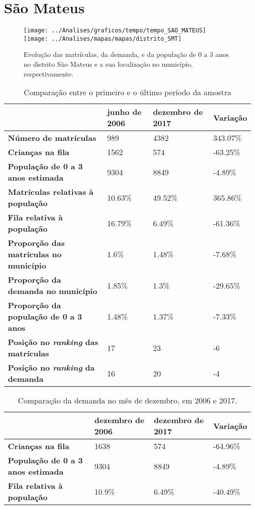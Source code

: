 \section{São Mateus}
\begin{figure}[H]
\centering
\texttt{[image: ../Analises/graficos/tempo/tempo\_SAO\_MATEUS]}
\texttt{[image: ../Analises/mapas/mapas/distrito\_SMT]}
\caption{Evolução das matrículas, da demanda, e da população de 0 a 3 anos no distrito São Mateus e a sua localização no município, respectivamente.}
\end{figure}
\begin{table}[H]
\begin{tabular}{l|l|l|l}
\textbf{}                                      & \textbf{junho de 2006}       & \textbf{dezembro de 2017}    & \textbf{Variação} \\ \hline
\textbf{Número de matrículas}                  & 989 & 4382 & 343.07\% \\ \hline
\textbf{Crianças na fila}                      & 1562 & 574 & -63.25\% \\ \hline
\textbf{População de 0 a 3 anos estimada}      & 9304 & 8849 & -4.89\% \\ \hline
\textbf{Matrículas relativas à população}      & 10.63\% & 49.52\% & 365.86\% \\ \hline
\textbf{Fila relativa à população}             & 16.79\% & 6.49\% & -61.36\% \\ \hline
\textbf{Proporção das matrículas no município} & 1.6\% & 1.48\% & -7.68\% \\ \hline
\textbf{Proporção da demanda no município}     & 1.85\% & 1.3\% & -29.65\% \\ \hline
\textbf{Proporção da população de 0 a 3 anos}  & 1.48\% & 1.37\% & -7.33\% \\ \hline
\textbf{Posição no \textit{ranking} das matrículas}     & 17 & 23 & -6 \\ \hline
\textbf{Posição no \textit{ranking} da demanda}         & 16 & 20 & -4 \\ 
\end{tabular}
\caption{Comparação entre o primeiro e o último período da amostra}
\end{table}
\begin{table}[H]
\begin{tabular}{l|l|l|l}
\textbf{}                                 & \textbf{dezembro de 2006} & \textbf{dezembro de 2017} & \textbf{Variação} \\ \hline
\textbf{Crianças na fila}                      & 1638 & 574 & -64.96\% \\ \hline
\textbf{População de 0 a 3 anos estimada}      & 9304 & 8849 & -4.89\% \\ \hline
\textbf{Fila relativa à população}             & 10.9\% & 6.49\% & -40.49\% \\
\end{tabular}
\caption{Comparação da demanda no mês de dezembro, em 2006 e 2017.}
\end{table}
